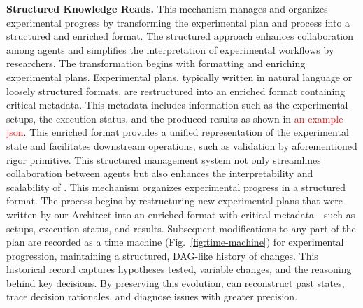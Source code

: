 \noindent\textbf{Structured Knowledge Reads.}
This mechanism manages and organizes experimental progress by transforming the experimental plan and process into a structured and enriched format. 
The structured approach enhances collaboration among agents and simplifies the interpretation of experimental workflows by researchers.
The transformation begins with formatting and enriching experimental plans. Experimental plans, typically written in natural language or loosely structured formats, are restructured into an enriched format containing critical metadata. 
This metadata includes information such as the experimental setups, the execution status, and the produced results as shown in \textcolor{red}{an example json}. 
This enriched format provides a unified representation of the experimental state and facilitates downstream operations, such as validation by aforementioned rigor primitive.
This structured management system not only streamlines collaboration between agents but also enhances the interpretability and scalability of \sys.
\fi
This mechanism organizes experimental progress in a structured format. 
The process begins by restructuring new experimental plans that were written by our Architect into an enriched format with critical metadata—such as setups, execution status, and results. 
Subsequent modifications to any part of the plan are recorded as a time machine (Fig.~\ref{fig:time-machine}) for experimental progression, maintaining a structured, DAG-like history of changes. This historical record captures hypotheses tested, variable changes, and the reasoning behind key decisions. By preserving this evolution, \sys can reconstruct past states, trace decision rationales, and diagnose issues with greater precision. 


